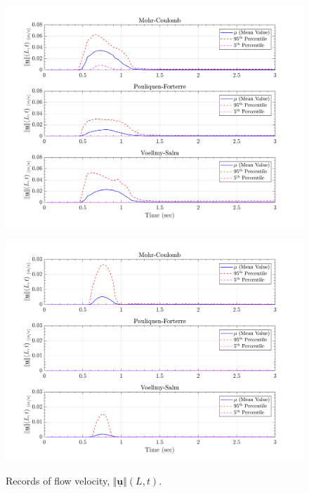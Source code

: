 \documentclass{article}
\begin{document}
\begin{figure}[H]
	\begin{minipage}[b]{0.5\linewidth}
    	\centering
    	\includegraphics[width=1\textwidth]{InclinedPlane/LocalRecords/Records/Vel_L15.png}
    	\label{fig:Ramp-L3-Vel}
	\end{minipage}
	\begin{minipage}[b]{0.5\linewidth}
		\centering
		\includegraphics[width=1\textwidth]{InclinedPlane/LocalRecords/Records/Vel_L17.png}
    	\label{fig:Ramp-L4-Vel}
    \end{minipage}
    \caption{Records of flow velocity, $\Vert \underline{\mathbf{u}} \Vert(L,t)$.}
    \label{fig:Ramp-LM-Vel}
\end{figure}
\end{document}
